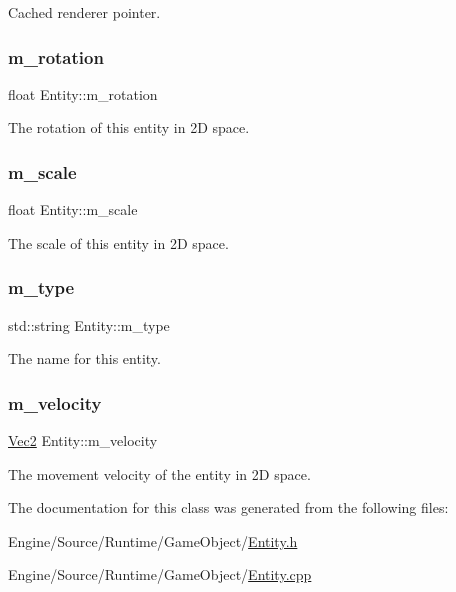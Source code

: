 Cached renderer pointer. \mbox{\label{class_entity_aa3ffa7fffee42fdf090ce02b56d6f305}} 
\subsubsection{\texorpdfstring{m\+\_\+rotation}{m\_rotation}}
{\footnotesize\ttfamily float Entity\+::m\+\_\+rotation\hspace{0.3cm}{\ttfamily [protected]}}

The rotation of this entity in 2D space. \mbox{\label{class_entity_a044400bb406b1494de4013a6df8a5933}} 
\subsubsection{\texorpdfstring{m\+\_\+scale}{m\_scale}}
{\footnotesize\ttfamily float Entity\+::m\+\_\+scale\hspace{0.3cm}{\ttfamily [protected]}}

The scale of this entity in 2D space. \mbox{\label{class_entity_ab0e743c5f841392748e675c43d3a33c4}} 
\subsubsection{\texorpdfstring{m\+\_\+type}{m\_type}}
{\footnotesize\ttfamily std\+::string Entity\+::m\+\_\+type\hspace{0.3cm}{\ttfamily [protected]}}

The name for this entity. \mbox{\label{class_entity_ae284f1957cfefc2bd7fd02812a1ee62e}} 
\subsubsection{\texorpdfstring{m\+\_\+velocity}{m\_velocity}}
{\footnotesize\ttfamily \mbox{\hyperlink{struct_vec2}{Vec2}} Entity\+::m\+\_\+velocity\hspace{0.3cm}{\ttfamily [protected]}}

The movement velocity of the entity in 2D space. 

The documentation for this class was generated from the following files\+:\begin{DoxyCompactItemize}
\item 
Engine/\+Source/\+Runtime/\+Game\+Object/\mbox{\hyperlink{_entity_8h}{Entity.\+h}}\item 
Engine/\+Source/\+Runtime/\+Game\+Object/\mbox{\hyperlink{_entity_8cpp}{Entity.\+cpp}}\end{DoxyCompactItemize}
